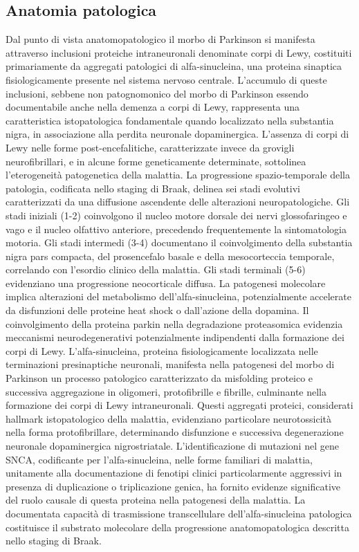 \subsection{Anatomia patologica}
Dal punto di vista anatomopatologico il morbo di Parkinson si manifesta attraverso inclusioni proteiche intraneuronali denominate corpi di Lewy, costituiti primariamente da aggregati patologici di alfa-sinucleina, una proteina sinaptica fisiologicamente presente nel sistema nervoso centrale. L'accumulo di queste inclusioni, sebbene non patognomonico del morbo di Parkinson essendo documentabile anche nella demenza a corpi di Lewy, rappresenta una caratteristica istopatologica fondamentale quando localizzato nella substantia nigra, in associazione alla perdita neuronale dopaminergica. L'assenza di corpi di Lewy nelle forme post-encefalitiche, caratterizzate invece da grovigli neurofibrillari, e in alcune forme geneticamente determinate, sottolinea l'eterogeneità patogenetica della malattia.
La progressione spazio-temporale della patologia, codificata nello staging di Braak, delinea sei stadi evolutivi caratterizzati da una diffusione ascendente delle alterazioni neuropatologiche. Gli stadi iniziali (1-2) coinvolgono il nucleo motore dorsale dei nervi glossofaringeo e vago e il nucleo olfattivo anteriore, precedendo frequentemente la sintomatologia motoria. Gli stadi intermedi (3-4) documentano il coinvolgimento della substantia nigra pars compacta, del prosencefalo basale e della mesocorteccia temporale, correlando con l'esordio clinico della malattia. Gli stadi terminali (5-6) evidenziano una progressione neocorticale diffusa.
La patogenesi molecolare implica alterazioni del metabolismo dell'alfa-sinucleina, potenzialmente accelerate da disfunzioni delle proteine heat shock o dall'azione della dopamina. Il coinvolgimento della proteina parkin nella degradazione proteasomica evidenzia meccanismi neurodegenerativi potenzialmente indipendenti dalla formazione dei corpi di Lewy.
L'alfa-sinucleina, proteina fisiologicamente localizzata nelle terminazioni presinaptiche neuronali, manifesta nella patogenesi del morbo di Parkinson un processo patologico caratterizzato da misfolding proteico e successiva aggregazione in oligomeri, protofibrille e fibrille, culminante nella formazione dei corpi di Lewy intraneuronali. Questi aggregati proteici, considerati hallmark istopatologico della malattia, evidenziano particolare neurotossicità nella forma protofibrillare, determinando disfunzione e successiva degenerazione neuronale dopaminergica nigrostriatale.
L'identificazione di mutazioni nel gene SNCA, codificante per l'alfa-sinucleina, nelle forme familiari di malattia, unitamente alla documentazione di fenotipi clinici particolarmente aggressivi in presenza di duplicazione o triplicazione genica, ha fornito evidenze significative del ruolo causale di questa proteina nella patogenesi della malattia. La documentata capacità di trasmissione transcellulare dell'alfa-sinucleina patologica costituisce il substrato molecolare della progressione anatomopatologica descritta nello staging di Braak.

